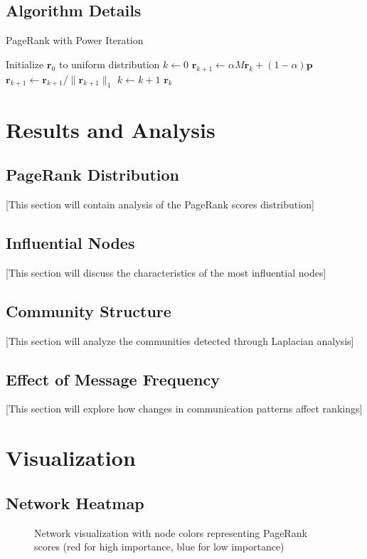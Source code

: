 \documentclass[12pt,letterpaper]{article}
\begin{document}
\subsection{Algorithm Details}
\begin{algorithm}
\caption{PageRank with Power Iteration}
\begin{algorithmic}
\STATE Initialize $\mathbf{r}_0$ to uniform distribution
\STATE $k \gets 0$
    \STATE $\mathbf{r}_{k+1} \gets \alpha M \mathbf{r}_k + (1-\alpha)\mathbf{p}$
    \STATE $\mathbf{r}_{k+1} \gets \mathbf{r}_{k+1} / \|\mathbf{r}_{k+1}\|_1$
    \STATE $k \gets k + 1$
\ENDWHILE
\RETURN $\mathbf{r}_k$
\end{algorithmic}
\end{algorithm}

\section{Results and Analysis}
\subsection{PageRank Distribution}
[This section will contain analysis of the PageRank scores distribution]

\subsection{Influential Nodes}
[This section will discuss the characteristics of the most influential nodes]

\subsection{Community Structure}
[This section will analyze the communities detected through Laplacian analysis]

\subsection{Effect of Message Frequency}
[This section will explore how changes in communication patterns affect rankings]

\section{Visualization}
\subsection{Network Heatmap}
\begin{figure}[H]
    \caption{Network visualization with node colors representing PageRank scores (red for high importance, blue for low importance)}
    \label{fig:network}
\end{figure}
\end{document}
